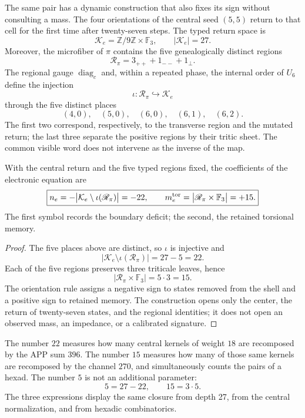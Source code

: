 The same pair has a dynamic construction that also fixes its sign without
consulting a mass. The four orientations of the central seed
\((5,5)\) return to that cell for the first time after twenty-seven steps. The
typed return space is
\[
 \mathcal K_e=\mathbb Z/9\mathbb Z\times\mathbb F_3,
 \qquad |\mathcal K_e|=27.
\]
Moreover, the microfiber of \(\pi\) contains the five genealogically
distinct regions
\[
 \mathscr R_\pi=3_{++}+1_{--}+1_{\perp}.
\]
The regional gauge \(\operatorname{diag}_c\) and, within a repeated phase,
the internal order of \(U_6\) define the injection
\[
 \iota:\mathscr R_\pi\hookrightarrow\mathcal K_e
\]
through the five distinct places
\[
 (4,0),\quad(5,0),\quad(6,0),\quad(6,1),\quad(6,2).
\]
The first two correspond, respectively, to the transverse region and
the mutated return; the last three separate the positive regions by their
tritic sheet. The common visible word does not intervene as the inverse of the map.

\begin{theorem}
\label{p12-83-c15-s2:thm:selector-persistencia-electron-rev7}
With the central return and the five typed regions fixed, the coefficients of
the electronic equation are
\[
 \boxed{
 n_e=-\bigl|\mathcal K_e\setminus\iota(\mathscr R_\pi)\bigr|=-22,
 \qquad
 m_e^{\rm tor}=\bigl|\mathscr R_\pi\times\mathbb F_3\bigr|=+15.}
\]
The first symbol records the boundary deficit; the second, the retained torsional memory.
\end{theorem}

\begin{proof}
The five places above are distinct, so \(\iota\) is
injective and
\[
 |\mathcal K_e\setminus\iota(\mathscr R_\pi)|=27-5=22.
\]
Each of the five regions preserves three triticale leaves, hence
\[
 |\mathscr R_\pi\times\mathbb F_3|=5\cdot3=15.
\]
The orientation rule assigns a negative sign to states removed from the
shell and a positive sign to retained memory. The construction opens only the
center, the return of twenty-seven states, and the regional identities; it does not
open an observed mass, an impedance, or a calibrated signature.
\end{proof}

The number \(22\) measures how many central kernels of weight \(18\) are recomposed by the
APP sum \(396\). The number \(15\) measures how many of those same kernels
are recomposed by the channel \(270\), and simultaneously counts the pairs of a
hexad. The number \(5\) is not an additional parameter:
\[
 5=27-22,\qquad 15=3\cdot5.
\]
The three expressions display the same closure from depth 27,
from the central normalization, and from hexadic combinatorics.

